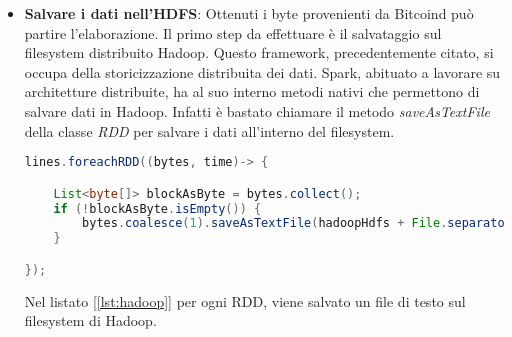 \begin{itemize}
\item \textbf{Salvare i dati nell'HDFS}: Ottenuti i byte provenienti da Bitcoind può partire l'elaborazione. Il primo step da effettuare è il salvataggio sul filesystem distribuito Hadoop. Questo framework, precedentemente citato, si occupa della storicizzazione distribuita dei dati. Spark, abituato a lavorare su architetture distribuite, ha al suo interno metodi nativi che permettono di salvare dati in Hadoop. Infatti è bastato chiamare il metodo \textit{saveAsTextFile} della classe \textit{RDD} per salvare i dati all'interno del filesystem.

\begin{lstlisting}[language=Java, label=lst:hadoop, caption={Salvataggio Bytes su HDFS.}]
lines.foreachRDD((bytes, time)-> {

	List<byte[]> blockAsByte = bytes.collect();
	if (!blockAsByte.isEmpty()) {
		bytes.coalesce(1).saveAsTextFile(hadoopHdfs + File.separator + "blocks" + File.separator);
	}

});
\end{lstlisting}

Nel listato [\ref{lst:hadoop}] per ogni RDD, viene salvato un file di testo sul filesystem di Hadoop.


\end{itemize}

